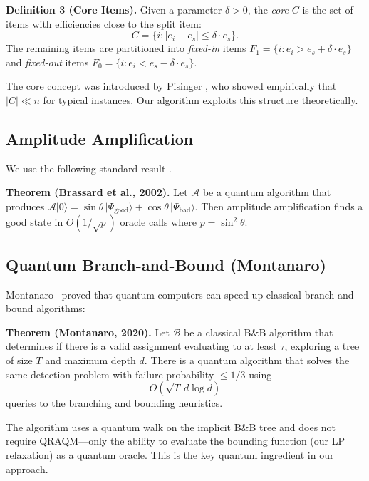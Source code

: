 \documentclass[conference]{IEEEtran} \IEEEoverridecommandlockouts
\begin{document}
\textbf{Definition 3 (Core Items).} Given a parameter $\delta > 0$, the \textit{core} $C$ is the set of items with efficiencies close to the split item:
\begin{equation}
    C = \{i : |e_i - e_s| \leq \delta \cdot e_s\}.
    \label{eq:core}
\end{equation}
The remaining items are partitioned into \textit{fixed-in} items $F_1 = \{i : e_i > e_s + \delta \cdot e_s\}$ and \textit{fixed-out} items $F_0 = \{i : e_i < e_s - \delta \cdot e_s\}$.

The core concept was introduced by Pisinger \cite{ref4}, who showed empirically that $|C| \ll n$ for typical instances. Our algorithm exploits this structure theoretically.

\subsection{Amplitude Amplification}

We use the following standard result \cite{ref11}.

\textbf{Theorem (Brassard et al., 2002).} Let $\mathcal{A}$ be a quantum algorithm that produces $\mathcal{A}|0\rangle = \sin\theta\,|\Psi_{\text{good}}\rangle + \cos\theta\,|\Psi_{\text{bad}}\rangle$. Then amplitude amplification finds a good state in $O(1/\sqrt{p})$ oracle calls where $p = \sin^2\theta$.

\subsection{Quantum Branch-and-Bound (Montanaro)}

Montanaro~\cite{ref24} proved that quantum computers can speed up classical branch-and-bound algorithms:

\textbf{Theorem (Montanaro, 2020).} Let $\mathcal{B}$ be a classical B\&B algorithm that determines if there is a valid assignment evaluating to at least $\tau$, exploring a tree of size $T$ and maximum depth $d$. There is a quantum algorithm that solves the same detection problem with failure probability $\le 1/3$ using
\begin{equation}
    O(\sqrt{T}\, d \log d)
    \label{eq:montanaro}
\end{equation}
queries to the branching and bounding heuristics.

The algorithm uses a quantum walk on the implicit B\&B tree and does not require QRAQM---only the ability to evaluate the bounding function (our LP relaxation) as a quantum oracle. This is the key quantum ingredient in our approach.
\end{document}
